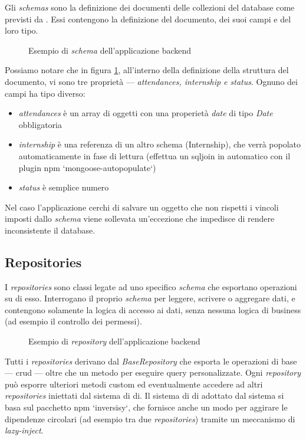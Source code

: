 Gli \textit{schemas} sono la definizione dei documenti delle collezioni del database come previsti da \mongoosejs. Essi contengono la definizione del documento, dei suoi campi e del loro tipo.
\begin{figure}[!h] 
	\centering    
	
	\caption[Esempio di \textit{schema} dell'applicazione \gls{backend}]{Esempio di \textit{schema} dell'applicazione \gls{backend}}
	\label{fig:server-schema}
\end{figure}
Possiamo notare che in figura \ref{fig:server-schema}, all'interno della definizione della struttura del documento, vi sono tre proprietà --- \textit{attendances, internship e status}. Ognuno dei campi ha tipo diverso:
\begin{itemize}
	\item \textit{attendances} è un array di oggetti con una properietà \textit{date} di tipo \textit{Date} obbligatoria
	\item \textit{internship} è una referenza di un altro schema (Internship), che verrà popolato automaticamente in fase di lettura (effettua un \gls{sqljoin} in automatico con il plugin \acrshort{npm} `mongoose-autopopulate`)
	\item \textit{status} è semplice numero
\end{itemize}
Nel caso l'applicazione cerchi di salvare un oggetto che non rispetti i vincoli imposti dallo \textit{schema} viene sollevata un'eccezione che impedisce di rendere inconsistente il database.

\subsection{Repositories}
I \textit{repositories} sono classi legate ad uno specifico \textit{schema} che esportano operazioni su di esso. Interrogano il proprio \textit{schema} per leggere, scrivere o aggregare dati, e contengono solamente la logica di accesso ai dati, senza nessuna logica di business (ad esempio il controllo dei permessi).
\begin{figure}[!h] 
	\centering    
	
	\caption[Esempio di \textit{Repository}]{Esempio di \textit{repository} dell'applicazione \gls{backend}}
	\label{fig:server-repository}
\end{figure}
Tutti i \textit{repositories} derivano dal \textit{BaseRepository} che esporta le operazioni di base --- \gls{crud} --- oltre che un metodo per eseguire query personalizzate.
Ogni \textit{repository} può esporre ulteriori metodi custom ed eventualmente accedere ad altri \textit{repositories} iniettati dal sistema di \acrfull{di}. Il sistema di \acrshort{di} adottato dal sistema si basa sul pacchetto \acrshort{npm} `inversisy`, che fornisce anche un modo per aggirare le dipendenze circolari (ad esempio tra due \textit{repositories}) tramite un meccanismo di \textit{lazy-inject}.

